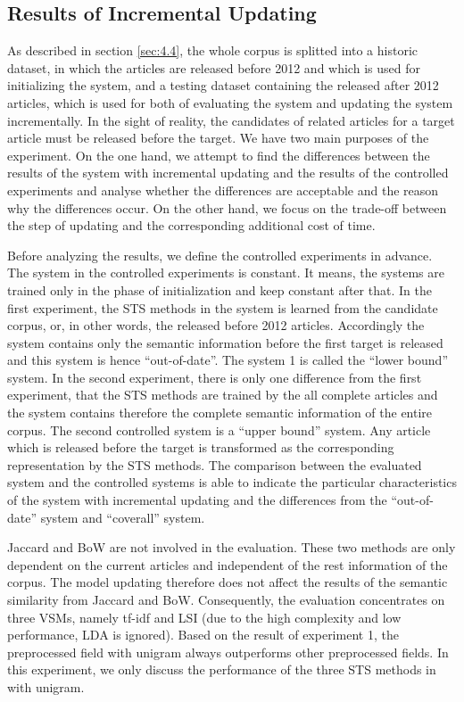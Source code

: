 \subsection{Results of Incremental Updating}
\label{sec:5.4}

As described in section \ref{sec:4.4}, the whole corpus is splitted into a historic dataset, in which the articles are released before 2012 and which is used for initializing the system, and a testing dataset containing the released after 2012 articles, which is used for both of evaluating the system and updating the system incrementally. In the sight of reality, the candidates of related articles for a target article must be released before the target. We have two main purposes of the experiment. On the one hand, we attempt to find the differences between the results of the system with incremental updating and the results of the controlled experiments and analyse whether the differences are acceptable and the reason why the differences occur. On the other hand, we focus on the trade-off between the step of updating and the corresponding additional cost of time. 

Before analyzing the results, we define the controlled experiments in advance. The system in the controlled experiments is constant. It means, the systems are trained only in the phase of initialization and keep constant after that. In the first experiment, the STS methods in the system is learned from the candidate corpus, or, in other words, the released before 2012 articles. Accordingly the system contains only the semantic information before the first target is released and this system is hence ``out-of-date''. The system 1 is called the ``lower bound'' system. In the second experiment, there is only one difference from the first experiment, that the STS methods are trained by the all complete articles and the system contains therefore the complete semantic information of the entire corpus. The second controlled system is a ``upper bound'' system. Any article which is released before the target is transformed as the corresponding representation by the STS methods.  The comparison between the evaluated system and the controlled systems is able to indicate the particular characteristics of the system with incremental updating and the differences from the ``out-of-date'' system and ``coverall'' system. 

Jaccard and BoW are not involved in the evaluation. These two methods are only dependent on the current articles and independent of the rest information of the corpus. The model updating therefore does not affect the results of the semantic similarity from Jaccard and BoW. Consequently, the evaluation concentrates on three VSMs, namely tf-idf and LSI (due to the high complexity and low performance, LDA is ignored). Based on the result of experiment 1, the preprocessed field \icontent{} with unigram always outperforms other preprocessed fields. In this experiment, we only discuss the performance of the three STS methods in \icontent{} with unigram. 

